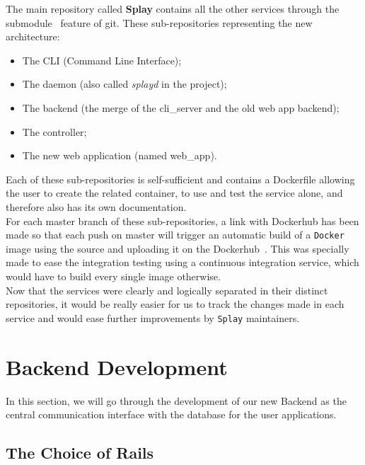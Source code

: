 \documentclass{eplmastersthesis}
\begin{document}
        The main repository called \textbf{Splay} contains all the other services
        through the submodule~\cite{GitSubmodules} feature of git. These
        sub-repositories representing the new architecture:

        \begin{itemize}
          \item The CLI (Command Line Interface);
          \item The daemon (also called \textit{splayd} in the project);
          \item The backend (the merge of the cli\_server and the old web app backend);
          \item The controller;
          \item The new web application (named web\_app).
        \end{itemize}

        Each of these sub-repositories is self-sufficient and contains a Dockerfile
        allowing the user to create the related container, to use and test
        the service alone, and therefore also has its own documentation.\\

        For each master branch of these sub-repositories, a link with Dockerhub
        has been made so that each push on master will trigger an automatic build
        of a \texttt{Docker} image using the source and uploading it on the
        Dockerhub~\cite{DockerHubGithub}.
        This was specially made to ease the integration testing using a
        continuous integration service, which would have to build every single
        image otherwise.\\

        Now that the services were clearly and logically separated in their
        distinct repositories, it would be really easier for us to track
        the changes made in each service and would ease further improvements
        by \texttt{Splay} maintainers.

    \section{Backend Development}

      In this section, we will go through the development of our new Backend
      as the central communication interface with the database for the user
      applications.\\

      \subsection{The Choice of Rails}
\end{document}
